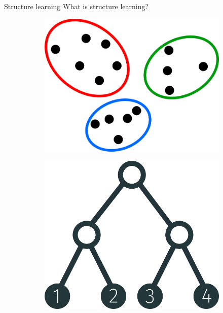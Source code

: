 \documentclass[10pt, compress]{beamer}
\begin{document}
\begin{frame}{Structure learning}
  \centering
  What is structure learning?

  \pause
  \centering
  \begin{figure}
    \centering
    \pause
    \begin{subfigure}[t]{0.27\textwidth}
        \centering
        \includegraphics[width=\textwidth]{img/clustering}
    \end{subfigure}
    \pause
    \hfill
    \begin{subfigure}[t]{0.27\textwidth}
        \centering
        \includegraphics[width=\textwidth]{img/tree-1234-balanced}

\end{subfigure}
\end{figure}
\end{frame}
\end{document}
